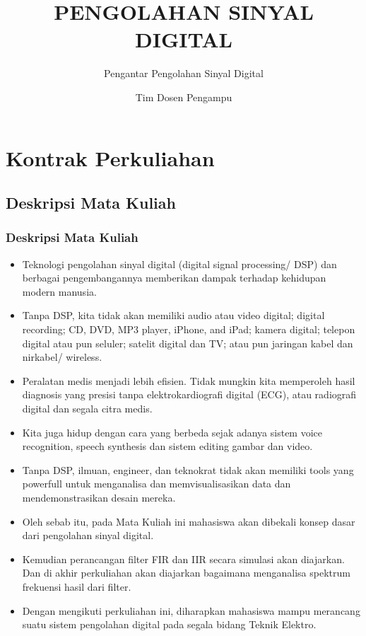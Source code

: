 \documentclass[pdflatex,compress]{beamer}
\title{PENGOLAHAN SINYAL DIGITAL}
\subtitle{Pengantar Pengolahan Sinyal Digital}
\author{Tim Dosen Pengampu}
\begin{document}
\maketitle

\section{Kontrak Perkuliahan}

\subsection{Deskripsi Mata Kuliah}

\begin{frame}
	\frametitle{Deskripsi Mata Kuliah}
	\begin{itemize}
		\item Teknologi pengolahan sinyal digital (digital signal processing/ DSP) dan berbagai pengembangannya memberikan dampak terhadap kehidupan modern manusia. 
		\item Tanpa DSP, kita tidak akan memiliki audio atau video digital; digital recording; CD, DVD, MP3 player, iPhone, and iPad; kamera digital; telepon digital atau pun seluler; satelit digital dan TV; atau pun jaringan kabel dan nirkabel/ wireless.
		\item Peralatan medis menjadi lebih efisien. Tidak mungkin kita memperoleh hasil diagnosis yang presisi tanpa elektrokardiografi digital (ECG), atau radiografi digital dan segala citra medis.
	\end{itemize}
\end{frame}

\begin{frame}
	\begin{itemize}
		\item Kita juga hidup dengan cara yang berbeda sejak adanya sistem voice recognition, speech synthesis dan sistem editing gambar dan video.
		\item Tanpa DSP, ilmuan, engineer, dan teknokrat tidak akan memiliki tools yang powerfull untuk menganalisa dan memvisualisasikan data dan mendemonstrasikan desain mereka.
		\item Oleh sebab itu, pada Mata Kuliah ini mahasiswa akan dibekali konsep dasar dari pengolahan sinyal digital.
		\item Kemudian perancangan filter FIR dan IIR secara simulasi akan diajarkan. Dan di akhir perkuliahan akan diajarkan bagaimana menganalisa spektrum frekuensi hasil dari filter.
		\item Dengan mengikuti perkuliahan ini, diharapkan mahasiswa mampu merancang suatu sistem pengolahan digital pada segala bidang Teknik Elektro.
	\end{itemize}
\end{frame}
\end{document}
